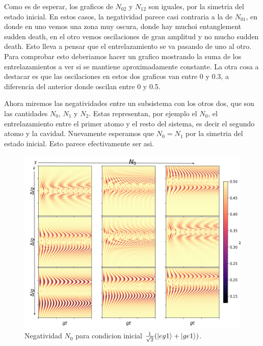 \begin{figure}
    \centering
    \texttt{[image: figuras/ch2/negatividad/3x3 eg1+ \$N\_\{12]}$ 012 012.png}
    \caption{Negatividad $N_{12}$ para condicion inicial $\frac{1}{\sqrt{2}}(\ket{eg1}+\ket{ge1})$.}
    \label{fig2:N_12_eg1+}
\end{figure}
Como es de esperar, los graficos de $N_{02}$ y $N_{12}$ son iguales, por la simetria del estado inicial. En estos casos, la negatividad parece casi contraria a la de $N_{01}$, en donde en uno vemos una zona muy oscura, donde hay muchoi entanglement sudden death, en el otro vemos oscilaciones de gran amplitud y no mucho sudden death. Esto lleva a pensar que el entrelazamiento se va pasando de uno al otro. Para comprobar esto deberiamos hacer un grafico mostrando la suma de los entrelazamientos a ver si se mantiene aproximadamente constante. La otra cosa a destacar es que las oscilaciones en estos dos graficos van entre 0 y 0.3, a diferencia del anterior donde oscilan entre 0 y 0.5. 

Ahora miremos las negatividades entre un subsistema con los otros dos, que son las cantidades $N_0$, $N_1$ y $N_2$. Estas representan, por ejemplo el $N_0$, el entrelazamiento entre el primer atomo y el resto del sistema, es decir el segundo atomo y la cavidad. Nuevamente esperamos que $N_0=N_1$ por la simetria del estado inicial. Esto parece efectivamente ser asi.
\begin{figure}
    \centering
    \includegraphics[width=0.8\linewidth]{figuras/ch2/negatividad/3x3 eg1+ $N_0$ 012 012.png}
    \caption{Negatividad $N_{0}$ para condicion inicial $\frac{1}{\sqrt{2}}(\ket{eg1}+\ket{ge1})$.}
    \label{fig2:N_0_eg1+}
\end{figure}

